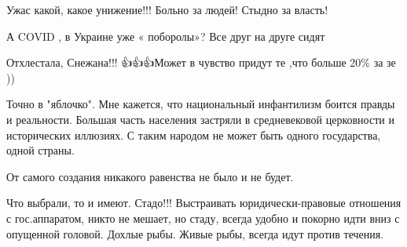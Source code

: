 \begin{itemize}
Ужас какой, какое унижение!!! Больно за людей! Стыдно за власть!

 
А COVID , в Украине уже « поборолы»? Все друг на друге сидят 🤦🏼‍♀️

 
Отхлестала, Снежана!!! 👍👍👍Может в чувство придут те ,что больше 20\% за зе ))


Точно в "яблочко". Мне кажется, что национальный инфантилизм боится правды и
реальности. Большая часть населения застряли в средневековой церковности и
исторических иллюзиях. С таким народом не может быть одного государства, одной
страны.


 
От самого создания никакого равенства не было и не будет.

 

Что выбрали, то и имеют. Стадо!!! Выстраивать юридически-правовые отношения с
гос.аппаратом, никто не мешает, но стаду, всегда удобно и покорно идти вниз с
опущенной головой. Дохлые рыбы. Живые рыбы, всегда идут против течения.


 


\end{itemize}
